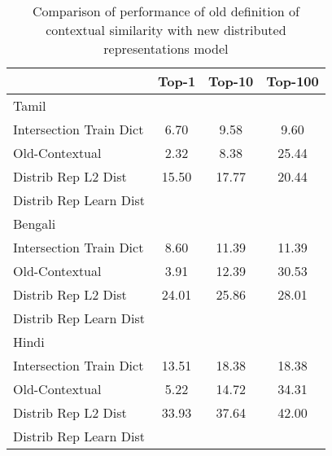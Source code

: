\documentclass[11pt,letterpaper]{article}
\begin{document}
\begin{table}
\begin{center}
\begin{tabular}{|l|c|c|c|}
\hline
& Top-1 & Top-10 & Top-100 \\
\hline
\multicolumn{4}{|l|}{Tamil}  \\
\hline
Intersection Train Dict & 6.70 & 9.58 & 9.60 \\
Old-Contextual & 2.32 & 8.38 & 25.44 \\ 
Distrib Rep L2 Dist & 15.50 & 17.77 & 20.44 \\
Distrib Rep Learn Dist & & & \\
\hline
\multicolumn{4}{|l|}{Bengali}  \\
\hline
Intersection Train Dict & 8.60 & 11.39 & 11.39 \\
Old-Contextual & 3.91 & 12.39 & 30.53 \\
Distrib Rep L2 Dist & 24.01 & 25.86 & 28.01 \\
Distrib Rep Learn Dist & & & \\
\hline
\multicolumn{4}{|l|}{Hindi}  \\
\hline
Intersection Train Dict & 13.51 & 18.38 & 18.38 \\
Old-Contextual & 5.22 & 14.72 & 34.31 \\
Distrib Rep L2 Dist & 33.93 & 37.64 & 42.00 \\
Distrib Rep Learn Dist & & & \\
\hline
\end{tabular}
\end{center}
\caption{Comparison of performance of old definition of contextual similarity with new distributed representations model}\label{accresults}
\end{table}








\end{document}
